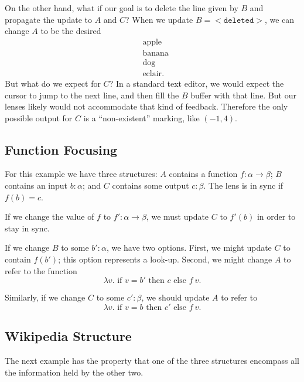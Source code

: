 \documentclass{article}
\begin{document}
On the other hand, what if our goal is to delete the line given
by $B$ and propagate the update to $A$ and $C$? When we update
$B = <\texttt{deleted}>$, we can change $A$ to be the desired
\begin{align*}
  &\text{apple} \\
  &\text{banana} \\
  &\text{dog} \\
  &\text{eclair}.
\end{align*}
But what do we expect for $C$? In a standard
text editor, we would expect the cursor to jump to the next line,
and then fill the $B$ buffer with that line. But our lenses
likely would not accommodate that kind of feedback.
Therefore the only possible output
for $C$ is a ``non-existent'' marking, like $(-1,4)$. 


\subsection{Function Focusing}

For this example we have three structures: 
$A$ contains a function $f : \alpha \rightarrow \beta$;
$B$ contains an input $b : \alpha$; and 
$C$ contains some output $c : \beta$. The
lens is in sync if $f(b) = c$. 

If we change the value of $f$ to $f':\alpha \rightarrow \beta$,
we must update $C$ to $f'(b)$ in order to stay in sync. 

If we change $B$ to some $b' : \alpha$, we have two options. 
First, we might update $C$ to contain $f(b')$; this option
represents a look-up. 
Second, we might change $A$ to refer to the function 
\[ \lambda v. \text{ if } v=b' \text{ then } c \text{ else } f~v. \]

Similarly, if we change $C$ to some $c' : \beta$, we should update $A$ to 
refer to 
\[ \lambda v. \text{ if } v=b \text{ then } c' \text{ else } f~v. \]

\subsection{Wikipedia Structure}

The next example has the property that one of the three structures encompass
all the information held by the other two. 
\end{document}
